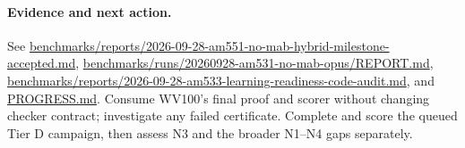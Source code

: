 \documentclass[11pt]{article}
\begin{document}
\paragraph{Evidence and next action.}
See \url{benchmarks/reports/2026-09-28-am551-no-mab-hybrid-milestone-accepted.md}, \url{benchmarks/runs/20260928-am531-no-mab-opus/REPORT.md}, \url{benchmarks/reports/2026-09-28-am533-learning-readiness-code-audit.md}, and \url{PROGRESS.md}. Consume WV100's final proof and scorer without changing checker contract; investigate any failed certificate. Complete and score the queued Tier D campaign, then assess N3 and the broader N1--N4 gaps separately.
\end{document}
